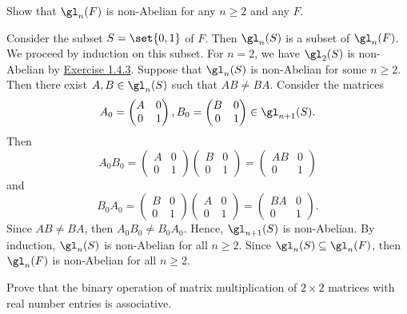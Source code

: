 \begin{exercise}\label{ex1.4.8}
    Show that $\gl_n(F)$ is non-Abelian for any $n \geq 2$ and any $F$.
\end{exercise}

\begin{sol}
    Consider the subset $S = \set{0, 1}$ of $F$. Then $\gl_n(S)$ is a subset of $\gl_n(F)$. We proceed by induction on this subset. For $n = 2$, we have $\gl_2(S)$ is non-Abelian by \hyperref[ex1.4.3]{Exercise 1.4.3}. Suppose that $\gl_n(S)$ is non-Abelian for some $n \geq 2$. Then there exist $A, B \in \gl_n(S)$ such that $AB \neq BA$. Consider the matrices
    \[A_0 = 
    \begin{pmatrix}
        A & 0 \\
        0 & 1
    \end{pmatrix},
    B_0 =
    \begin{pmatrix}
        B & 0 \\
        0 & 1
    \end{pmatrix} \in \gl_{n + 1}(S).\]
    Then
    \[A_0B_0 =
    \begin{pmatrix}
        A & 0 \\
        0 & 1
    \end{pmatrix}
    \begin{pmatrix}
        B & 0 \\
        0 & 1
    \end{pmatrix} =
    \begin{pmatrix}
        AB & 0 \\
        0 & 1
    \end{pmatrix}\]
    and
    \[B_0A_0 =
    \begin{pmatrix}
        B & 0 \\
        0 & 1
    \end{pmatrix}
    \begin{pmatrix}
        A & 0 \\
        0 & 1
    \end{pmatrix} =
    \begin{pmatrix}
        BA & 0 \\
        0 & 1
    \end{pmatrix}.\]
    Since $AB \neq BA$, then $A_0B_0 \neq B_0A_0$. Hence, $\gl_{n + 1}(S)$ is non-Abelian. By induction, $\gl_n(S)$ is non-Abelian for all $n \geq 2$. Since $\gl_n(S) \subseteq \gl_n(F)$, then $\gl_n(F)$ is non-Abelian for all $n \geq 2$.
\end{sol}

\begin{exercise}\label{ex1.4.9}
    Prove that the binary operation of matrix multiplication of $2 \times 2$ matrices with real number entries is associative.

\end{exercise}

